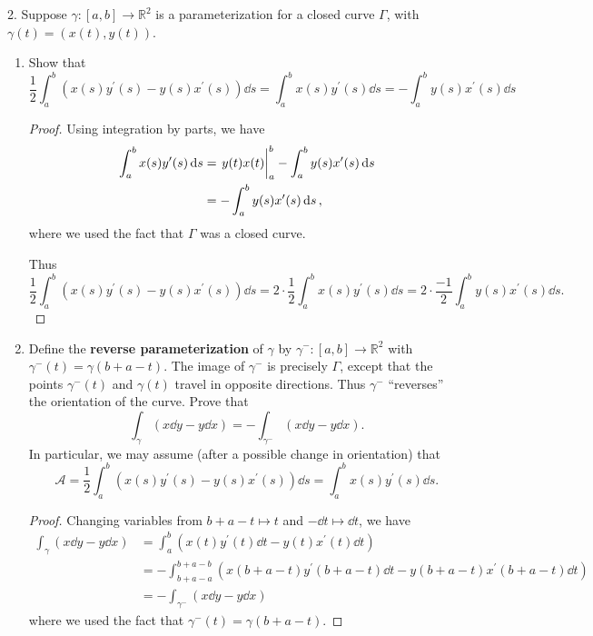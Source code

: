 \documentclass[11pt]{article}
\begin{document}
2. Suppose $\gamma\colon [a,b]\to \mathbb{R}^2$ is a parameterization for a closed curve $\Gamma$, with $\gamma(t) = (x(t),y(t))$.
\begin{enumerate}[label=(\alph*)]
  \item Show that \[\frac{1}{2}\int_a^b (x(s)y^{\prime}(s) - y(s)x^{\prime}(s))\dd{s} = \int_a^b x(s)y^{\prime}(s)\dd{s} = - \int_a^b y(s)x^{\prime}(s)\dd{s}\]
  \begin{proof}
    Using integration by parts, we have \begin{align*}
      \int_a^b x(s)y^{\prime}(s)\dd{s} &= \eval{y(t)x(t)}_a^b - \int_a^b y(s)x^{\prime}(s)\dd{s}\\
      &= - \int_a^b y(s)x^{\prime}(s)\dd{s},
    \end{align*}
    where we used the fact that $\Gamma$ was a closed curve.

    Thus \[\frac{1}{2}\int_a^b (x(s)y^{\prime}(s) - y(s)x^{\prime}(s))\dd{s} = 2\cdot \frac{1}{2}\int_a^b x(s)y^{\prime}(s)\dd{s} = 2\cdot \frac{-1}{2} \int_a^b y(s)x^{\prime}(s)\dd{s}.\]
  \end{proof}
  \item Define the \textbf{reverse parameterization} of $\gamma$ by $\gamma^{-}\colon [a,b]\to \mathbb{R}^2$ with $\gamma^{-}(t) = \gamma(b+a-t)$. The image of $\gamma^{-}$ is precisely $\Gamma$, except that the points $\gamma^{-}(t)$ and $\gamma(t)$ travel in opposite directions. Thus $\gamma^{-}$ ``reverses'' the orientation of the curve. Prove that \[\int_{\gamma}(x\dd{y}-y\dd{x}) = -\int_{\gamma^{-}} (x\dd{y}-y\dd{x}).\]
  In particular, we may assume (after a possible change in orientation) that \[\mathcal{A} = \frac{1}{2}\int_a^b (x(s)y^{\prime}(s) - y(s)x^{\prime}(s))\dd{s} =\int_a^b x(s)y^{\prime}(s)\dd{s}.\]
  \begin{proof}
    Changing variables from $b+a-t\mapsto t$ and $-\dd{t}\mapsto \dd{t}$, we have
    \begin{align*}
      \int_{\gamma} (x\dd{y}-y\dd{x}) &= \int_a^b (x(t)y^{\prime}(t)\dd{t} - y(t)x^{\prime}(t)\dd{t})\\
      &= -\int_{b+a-a}^{b+a-b} (x(b+a-t)y^{\prime}(b+a-t)\dd{t} - y(b+a-t)x^{\prime}(b+a-t)\dd{t})\\
      &= -\int_{\gamma^{-}} (x\dd{y}-y\dd{x})
    \end{align*}
    where we used the fact that $\gamma^{-}(t) = \gamma(b+a-t)$.
  \end{proof}
\end{enumerate}
\end{document}
